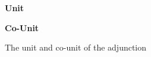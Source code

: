 \documentclass{Report}
\begin{document}
\begin{figure}
    \centering
    \begin{minipage}{0.47\textwidth}
      \begin{framed}
        \centering
        \textbf{Unit}
  
      \end{framed}
    \end{minipage}
    \quad
    \begin{minipage}{0.47\textwidth}
      \begin{framed}
        \centering
        \textbf{Co-Unit}
  
      \end{framed}
    \end{minipage}

\caption{The unit and co-unit of the adjunction}
    \label{UnitCoUnitDefinition}
\end{figure}
\end{document}
